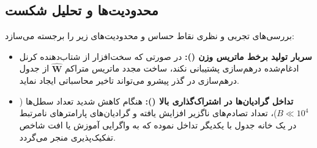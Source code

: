 \subsection{محدودیت‌ها و تحلیل شکست}
بررسی‌های تجربی و نظری نقاط حساس و محدودیت‌های زیر را برجسته می‌سازد:
\begin{itemize}
    \item \textbf{سربار تولید برخط ماتریس وزن ():} در صورتی که سخت‌افزار از شتاب‌دهنده کرنل ادغام‌شده درهم‌سازی پشتیبانی نکند، ساخت مجدد ماتریس متراکم $\hat{\mathbf{W}}$ از جدول درهم‌سازی در گذر پیشرو می‌تواند تاخیر محاسباتی ایجاد نماید.
    \item \textbf{تداخل گرادیان‌ها در اشتراک‌گذاری بالا ():} هنگام کاهش شدید تعداد سطل‌ها ($B \ll 10^4$)، تعداد تصادم‌های ناگزیر افزایش یافته و گرادیان‌های پارامترهای نامرتبط در یک خانه جدول با یکدیگر تداخل نموده که به واگرایی آموزش یا افت شاخص تفکیک‌پذیری منجر می‌گردد.
\end{itemize}
